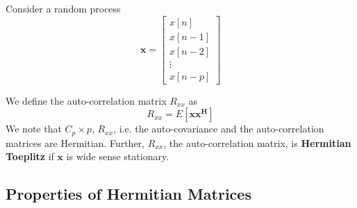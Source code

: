 Consider a random process \[
\mathbf{x}=
  \begin{bmatrix}
    x[n] \\
    x[n-1] \\
    x[n-2] \\
    \vdots \\
    x[n-p]
  \end{bmatrix}
\]

We define the auto-correlation matrix $R_{xx}$ as $$ R_{xx} = E[\mathbf{x}\mathbf{x^H}]$$ 
We note that $C_p\times p$, $R_{xx}$, i.e. the auto-covariance and the auto-correlation matrices are Hermitian. Further, $R_{xx}$, the auto-correlation matrix, is \textbf{Hermitian Toeplitz} if $\mathbf{x}$ is wide sense stationary.

\subsection{Properties of Hermitian Matrices}

